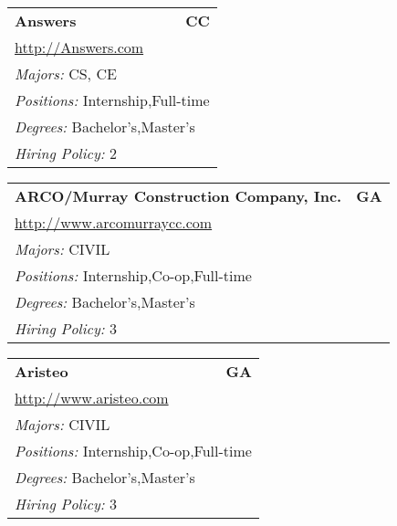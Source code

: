 \documentclass[twoside]{article}
\begin{document}
\begin{center}
\begin{multicols}{3}
\begin{FlushLeft}
\begin{minipage}{\columnwidth}
\end{minipage}
 
\begin{minipage}{\columnwidth}\begin{tabularx}{.95\columnwidth}{Xr}
                 {\Large\bf Answers} & {\Large\bf CC}\\
    \multicolumn{2}{p{.95\columnwidth}}{\url{http://Answers.com}}\\
    \multicolumn{2}{p{.95\columnwidth}}{\emph{Majors:} CS, CE}\\
    \multicolumn{2}{p{.95\columnwidth}}{\emph{Positions:} Internship,Full-time}\\
    \multicolumn{2}{p{.95\columnwidth}}{\emph{Degrees:} Bachelor's,Master's}\\
    \multicolumn{2}{p{.95\columnwidth}}{\emph{Hiring Policy:} 2}\\
    \end{tabularx}
    
\end{minipage}
 
\begin{minipage}{\columnwidth}\begin{tabularx}{.95\columnwidth}{Xr}
                 {\Large\bf ARCO/Murray Construction Company, Inc.} & {\Large\bf GA}\\
    \multicolumn{2}{p{.95\columnwidth}}{\url{http://www.arcomurraycc.com}}\\
    \multicolumn{2}{p{.95\columnwidth}}{\emph{Majors:} CIVIL}\\
    \multicolumn{2}{p{.95\columnwidth}}{\emph{Positions:} Internship,Co-op,Full-time}\\
    \multicolumn{2}{p{.95\columnwidth}}{\emph{Degrees:} Bachelor's,Master's}\\
    \multicolumn{2}{p{.95\columnwidth}}{\emph{Hiring Policy:} 3}\\
    \end{tabularx}
    
\end{minipage}
 
\begin{minipage}{\columnwidth}\begin{tabularx}{.95\columnwidth}{Xr}
                 {\Large\bf Aristeo} & {\Large\bf GA}\\
    \multicolumn{2}{p{.95\columnwidth}}{\url{http://www.aristeo.com}}\\
    \multicolumn{2}{p{.95\columnwidth}}{\emph{Majors:} CIVIL}\\
    \multicolumn{2}{p{.95\columnwidth}}{\emph{Positions:} Internship,Co-op,Full-time}\\
    \multicolumn{2}{p{.95\columnwidth}}{\emph{Degrees:} Bachelor's,Master's}\\
    \multicolumn{2}{p{.95\columnwidth}}{\emph{Hiring Policy:} 3}\\
    \end{tabularx}
    

\end{minipage}
\end{FlushLeft}
\end{multicols}
\end{center}
\end{document}
